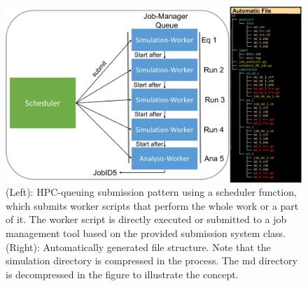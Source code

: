 \begin{figure}[h]
    \centering
    \includegraphics[width=\textwidth]{fig/implementation/SimulationExecutionManagment.png}
    \caption{(Left): HPC-queuing submission pattern using a scheduler function, which submits worker scripts that perform the whole work or a part of it. The worker script is directly executed or submitted to a job management tool based on the provided submission system class. (Right): Automatically generated file structure. Note that the simulation directory is compressed in the process. The md directory is decompressed in the figure to illustrate the concept. %
    }
    \label{fig: SimulationExecPattern}
\end{figure}

